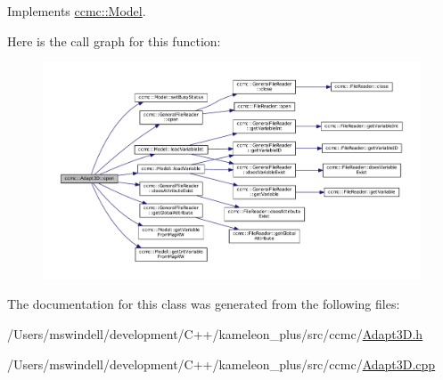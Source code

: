 Implements \hyperlink{classccmc_1_1_model_a3c64dc635c2c1a2fe2f8efa2a3666282}{ccmc\-::\-Model}.



Here is the call graph for this function\-:
\nopagebreak
\begin{figure}[H]
\begin{center}
\leavevmode
\includegraphics[width=350pt]{classccmc_1_1_adapt3_d_a02a5f2b5ba26cacd93f7c41c68c4b24a_cgraph}
\end{center}
\end{figure}




The documentation for this class was generated from the following files\-:\begin{DoxyCompactItemize}
\item 
/\-Users/mswindell/development/\-C++/kameleon\-\_\-plus/src/ccmc/\hyperlink{_adapt3_d_8h}{Adapt3\-D.\-h}\item 
/\-Users/mswindell/development/\-C++/kameleon\-\_\-plus/src/ccmc/\hyperlink{_adapt3_d_8cpp}{Adapt3\-D.\-cpp}\end{DoxyCompactItemize}
